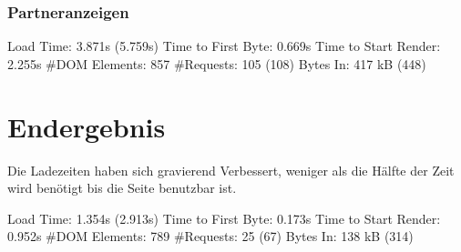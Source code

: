 \subsubsection{Partneranzeigen}
Load Time: 3.871s (5.759s)
Time to First Byte: 0.669s %
Time to Start Render: 2.255s
\#DOM Elements: 857 	
\#Requests: 105 (108)
Bytes In: 417 kB (448)


\section{Endergebnis}
Die Ladezeiten haben sich gravierend Verbessert, weniger als die Hälfte der Zeit wird benötigt bis die Seite benutzbar ist.

Load Time: 1.354s (2.913s)
Time to First Byte: 0.173s %
Time to Start Render: 0.952s
\#DOM Elements: 789 	
\#Requests: 25 (67)
Bytes In:  138 kB (314)
